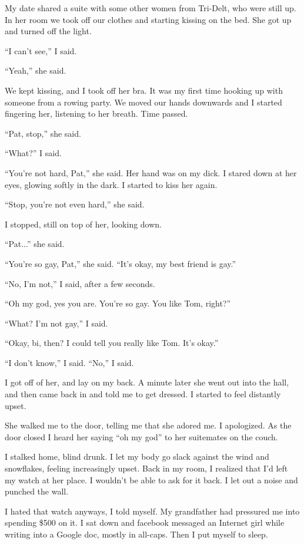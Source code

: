 My date shared a suite with some other women from Tri-Delt, who were still up.
In her room we took off our clothes and starting kissing on the bed.  She got up
and turned off the light.

``I can't see,'' I said.  

``Yeah,'' she said.

We kept kissing, and I took off her bra.  It was my first time hooking up with
someone from a rowing party.  We moved our hands downwards and I started
fingering her, listening to her breath.  Time passed.

``Pat, stop,'' she said.

``What?'' I said.

``You're not hard, Pat,'' she said.  Her hand was on my dick.  I stared down at
her eyes, glowing softly in the dark.  I started to kiss her again.

``Stop, you're not even hard,'' she said.

I stopped, still on top of her, looking down.

``Pat...'' she said.

``You're so gay, Pat,'' she said.  ``It's okay, my best friend is gay.''

``No, I'm not,'' I said, after a few seconds.

``Oh my god, yes you are.  You're so gay.  You like Tom, right?''

``What?  I'm not gay,'' I said.

``Okay, bi, then?  I could tell you really like Tom.  It's okay.''

``I don't know,'' I said.  ``No,'' I said.

I got off of her, and lay on my back.  A minute later she went out into the
hall, and then came back in and told me to get dressed.  I started to feel
distantly upset.

She walked me to the door, telling me that she adored me.  I apologized.  As the
door closed I heard her saying ``oh my god'' to her suitemates on the couch.

I stalked home, blind drunk.  I let my body go slack against the wind and
snowflakes, feeling increasingly upset.  Back in my room, I realized that I'd
left my watch at her place.  I wouldn't be able to ask for it back.  I let out a
noise and punched the wall. 

I hated that watch anyways, I told myself.  My grandfather had pressured me into
spending \$500 on it.   I sat down and facebook messaged an Internet girl while
writing into a Google doc, mostly in all-caps.  Then I put myself to sleep.

